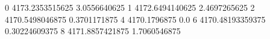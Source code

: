 0 4173.2353515625 3.0556640625
1 4172.6494140625 2.4697265625
2 4170.5498046875 0.3701171875
4 4170.1796875 0.0
6 4170.48193359375 0.30224609375
8 4171.8857421875 1.7060546875
